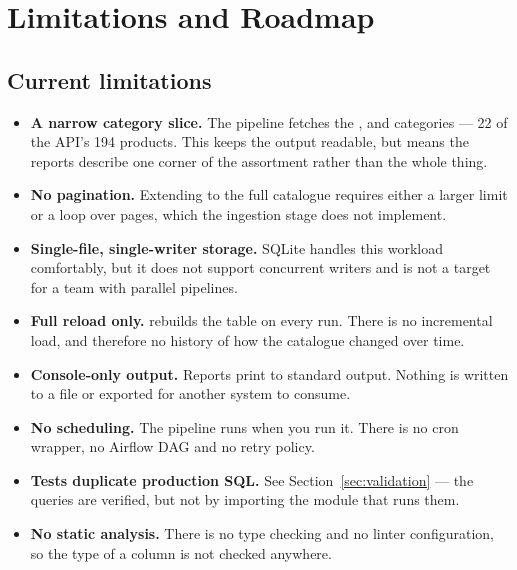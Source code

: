 \section{Limitations and Roadmap}

\subsection{Current limitations}

\begin{itemize}
  \item \textbf{A narrow category slice.} The pipeline fetches the
        ,  and 
        categories --- 22 of the API's 194 products. This keeps the output
        readable, but means the reports describe one corner of the
        assortment rather than the whole thing.
  \item \textbf{No pagination.} Extending to the full catalogue requires
        either a larger limit or a loop over pages, which the ingestion
        stage does not implement.
  \item \textbf{Single-file, single-writer storage.} SQLite handles this
        workload comfortably, but it does not support concurrent writers and
        is not a target for a team with parallel pipelines.
  \item \textbf{Full reload only.}  rebuilds the
        table on every run. There is no incremental load, and therefore no
        history of how the catalogue changed over time.
  \item \textbf{Console-only output.} Reports print to standard output.
        Nothing is written to a file or exported for another system to
        consume.
  \item \textbf{No scheduling.} The pipeline runs when you run it. There is
        no cron wrapper, no Airflow DAG and no retry policy.
  \item \textbf{Tests duplicate production SQL.} See
        Section~\ref{sec:validation} --- the queries are verified, but not
        by importing the module that runs them.
  \item \textbf{No static analysis.} There is no type checking and no
        linter configuration, so the type of a column is not checked
        anywhere.
\end{itemize}

